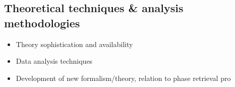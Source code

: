 \subsection{Theoretical techniques \& analysis methodologies}

\begin{itemize}
\item Theory sophistication and availability
\item Data analysis techniques
\item Development of new formalism/theory, relation to phase retrieval pro
\end{itemize}
